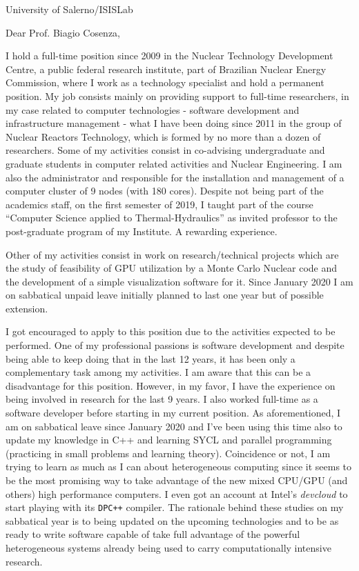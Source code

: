 \documentclass[11pt]{letter}
\begin{document}
\begin{letter}{University of Salerno/ISISLab}

  \opening{Dear Prof. Biagio Cosenza,}
  
  I hold a full-time position since 2009 in the Nuclear Technology Development Centre, a public federal
  research institute, part of Brazilian Nuclear Energy Commission, where I work as a technology
  specialist and hold a permanent position. My job consists mainly on
  providing support to full-time researchers, in my case
  related to computer technologies - software development and infrastructure management - what I have been
  doing since 2011 in the group of Nuclear Reactors Technology, which is formed by no more than a dozen of researchers.
  Some of my activities consist in co-advising undergraduate and graduate students in computer related
  activities and Nuclear Engineering. I am also the administrator and responsible for the installation and management of a
  computer cluster of 9 nodes (with 180 cores). Despite not being part of the academics staff, on the first semester of 2019,
  I taught part of the course ``Computer Science applied to Thermal-Hydraulics'' as invited professor to the post-graduate 
  program of my Institute. A rewarding experience.

  Other of my activities consist in work on research/technical projects which are the study of
  feasibility of GPU utilization by a Monte Carlo Nuclear code and the development of
  a simple visualization software for it. %
  Since January 2020 I am on sabbatical unpaid leave initially planned to last one year but of possible extension.
    
  I got encouraged to apply to this position due to the activities expected to be performed. One of my professional
  passions is software development and despite being able to keep doing that in the last 12 years, it has been only
  a complementary task among my activities. I am aware that this can be a disadvantage for this position. However, in my favor, I have the experience on being involved in research for the last 9 years. I also worked full-time as a software developer before starting in my current position. As aforementioned, I am on sabbatical leave since January 2020 and I've been using this time also to update my knowledge in C++ and learning SYCL and parallel programming (practicing in small problems and learning theory). Coincidence or not, I am trying to learn as much as I can about heterogeneous computing since it seems to be the most promising way to take advantage of the new mixed CPU/GPU (and others) high performance computers. I even got an account at Intel's \textit{devcloud} to start playing with its \texttt{DPC++} compiler. The rationale behind these studies on my sabbatical year is to being updated on the upcoming technologies and to be as ready to write software capable of take full advantage of the powerful heterogeneous systems already being used to carry computationally intensive research.


\end{letter}
\end{document}
